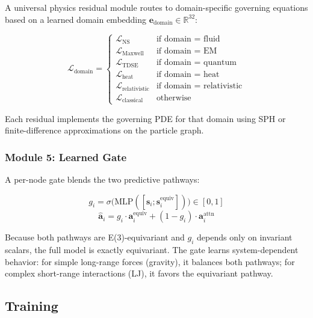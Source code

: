 \documentclass[11pt,a4paper]{article}
\begin{document}
A universal physics residual module routes to domain-specific governing equations based on a learned domain embedding $\mathbf{e}_{\text{domain}} \in \mathbb{R}^{32}$:

\begin{equation}
    \mathcal{L}_{\text{domain}} = \begin{cases}
        \mathcal{L}_{\text{NS}} & \text{if domain = fluid} \\
        \mathcal{L}_{\text{Maxwell}} & \text{if domain = EM} \\
        \mathcal{L}_{\text{TDSE}} & \text{if domain = quantum} \\
        \mathcal{L}_{\text{heat}} & \text{if domain = heat} \\
        \mathcal{L}_{\text{relativistic}} & \text{if domain = relativistic} \\
        \mathcal{L}_{\text{classical}} & \text{otherwise}
    \end{cases}
\end{equation}

Each residual implements the governing PDE for that domain using SPH or finite-difference approximations on the particle graph.

\subsubsection{Module 5: Learned Gate}

A per-node gate blends the two predictive pathways:

\begin{equation}
    g_i = \sigma\big(\text{MLP}([\mathbf{s}_i; \mathbf{s}_i^{\text{equiv}}])\big) \in [0,1]
\end{equation}
\begin{equation}
    \hat{\mathbf{a}}_i = g_i \cdot \mathbf{a}_i^{\text{equiv}} + (1 - g_i) \cdot \mathbf{a}_i^{\text{attn}}
\end{equation}

Because both pathways are E(3)-equivariant and $g_i$ depends only on invariant scalars, the full model is exactly equivariant. The gate learns system-dependent behavior: for simple long-range forces (gravity), it balances both pathways; for complex short-range interactions (LJ), it favors the equivariant pathway.

\subsection{Training}
\end{document}
